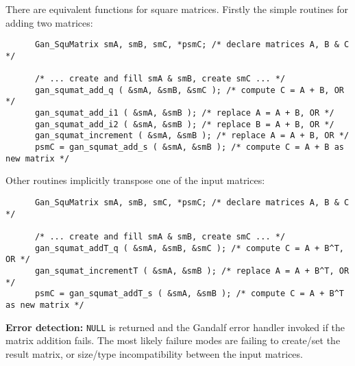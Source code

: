 There are equivalent functions for square matrices. Firstly the simple
routines for adding two matrices:
\begin{verbatim}
      Gan_SquMatrix smA, smB, smC, *psmC; /* declare matrices A, B & C */

      /* ... create and fill smA & smB, create smC ... */
      gan_squmat_add_q ( &smA, &smB, &smC ); /* compute C = A + B, OR */
      gan_squmat_add_i1 ( &smA, &smB ); /* replace A = A + B, OR */
      gan_squmat_add_i2 ( &smA, &smB ); /* replace B = A + B, OR */
      gan_squmat_increment ( &smA, &smB ); /* replace A = A + B, OR */
      psmC = gan_squmat_add_s ( &smA, &smB ); /* compute C = A + B as new matrix */
\end{verbatim}
Other routines implicitly transpose one of the input matrices:
\begin{verbatim}
      Gan_SquMatrix smA, smB, smC, *psmC; /* declare matrices A, B & C */

      /* ... create and fill smA & smB, create smC ... */
      gan_squmat_addT_q ( &smA, &smB, &smC ); /* compute C = A + B^T, OR */
      gan_squmat_incrementT ( &smA, &smB ); /* replace A = A + B^T, OR */
      psmC = gan_squmat_addT_s ( &smA, &smB ); /* compute C = A + B^T as new matrix */
\end{verbatim}

{\bf Error detection:} {\tt NULL} is returned and the Gandalf error handler
invoked if the matrix addition fails.
The most likely failure modes are failing to create/set the result matrix,
or size/type incompatibility between the input matrices.


